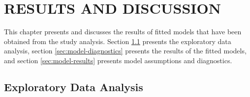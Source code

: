 \chapter{RESULTS AND DISCUSSION}

This chapter presents and discusses the results of fitted models that have been obtained from the study analysis.
Section \ref{sec:eda} presents the exploratory data analysis, section \ref{sec:model-diagnostics} presents the results of the fitted models, and section \ref{sec:model-results} presents model assumptions and diagnostics.


\section{Exploratory Data Analysis} \label{sec:eda}

\hspace*{0.5pt}
\addtocounter{table}{-1}

